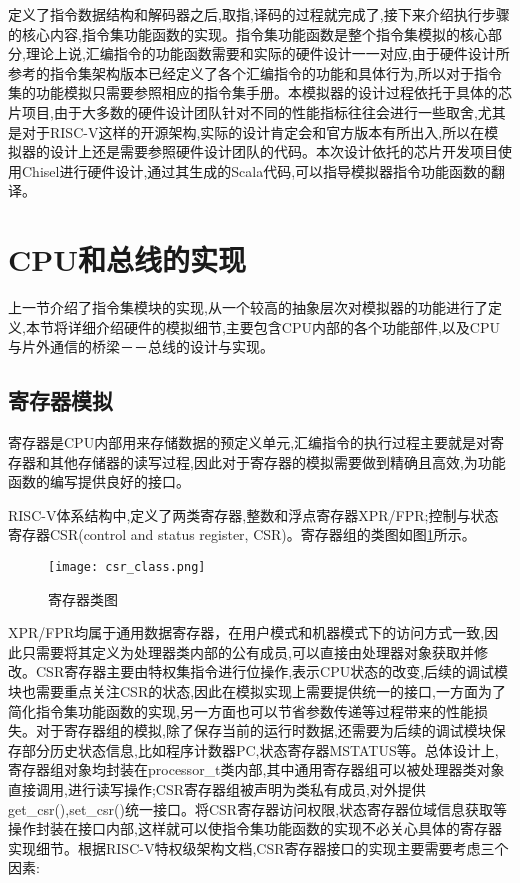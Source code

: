 定义了指令数据结构和解码器之后,取指,译码的过程就完成了,接下来介绍执行步骤的核心内容,指令集功能函数的实现。指令集功能函数是整个指令集模拟的核心部分,理论上说,汇编指令的功能函数需要和实际的硬件设计一一对应,由于硬件设计所参考的指令集架构版本已经定义了各个汇编指令的功能和具体行为,所以对于指令集的功能模拟只需要参照相应的指令集手册。本模拟器的设计过程依托于具体的芯片项目,由于大多数的硬件设计团队针对不同的性能指标往往会进行一些取舍,尤其是对于RISC-V这样的开源架构,实际的设计肯定会和官方版本有所出入,所以在模拟器的设计上还是需要参照硬件设计团队的代码。本次设计依托的芯片开发项目使用Chisel进行硬件设计,通过其生成的Scala代码,可以指导模拟器指令功能函数的翻译。


\section{CPU和总线的实现}

上一节介绍了指令集模块的实现,从一个较高的抽象层次对模拟器的功能进行了定义,本节将详细介绍硬件的模拟细节,主要包含CPU内部的各个功能部件,以及CPU与片外通信的桥梁－－总线的设计与实现。


\subsection{寄存器模拟}

寄存器是CPU内部用来存储数据的预定义单元,汇编指令的执行过程主要就是对寄存器和其他存储器的读写过程,因此对于寄存器的模拟需要做到精确且高效,为功能函数的编写提供良好的接口。


RISC-V体系结构中,定义了两类寄存器,整数和浮点寄存器XPR/FPR;控制与状态寄存器CSR(control and status register, CSR)。寄存器组的类图如图\ref{fig:csr_class}所示。
\begin{figure}[H]
    \centering
    \texttt{[image: csr\_class.png]}
    \caption{寄存器类图}
    \label{fig:csr_class}
\end{figure}


XPR/FPR均属于通用数据寄存器，在用户模式和机器模式下的访问方式一致,因此只需要将其定义为处理器类内部的公有成员,可以直接由处理器对象获取并修改。CSR寄存器主要由特权集指令进行位操作,表示CPU状态的改变,后续的调试模块也需要重点关注CSR的状态,因此在模拟实现上需要提供统一的接口,一方面为了简化指令集功能函数的实现,另一方面也可以节省参数传递等过程带来的性能损失。对于寄存器组的模拟,除了保存当前的运行时数据,还需要为后续的调试模块保存部分历史状态信息,比如程序计数器PC,状态寄存器MSTATUS等。总体设计上,寄存器组对象均封装在processor\_t类内部,其中通用寄存器组可以被处理器类对象直接调用,进行读写操作;CSR寄存器组被声明为类私有成员,对外提供get\_csr(),set\_csr()统一接口。将CSR寄存器访问权限,状态寄存器位域信息获取等操作封装在接口内部,这样就可以使指令集功能函数的实现不必关心具体的寄存器实现细节。根据RISC-V特权级架构文档,CSR寄存器接口的实现主要需要考虑三个因素:


